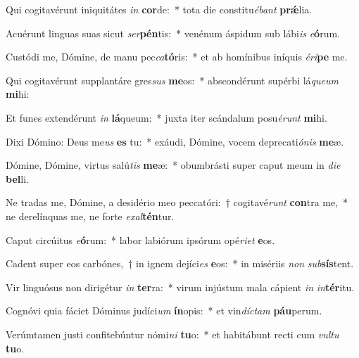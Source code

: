 \item Qui cogitavérunt iniquitátes \textit{in} \textbf{cor}de:~* tota die constitu\textit{é}\textit{bant} \textbf{prǽ}lia.
\item Acuérunt linguas suas sicut \textit{ser}\textbf{pén}tis:~* venénum áspidum sub lábi\textit{is} \textit{e}\textbf{ó}rum.
\item Custódi me, Dómine, de manu pec\textit{ca}\textbf{tó}ris:~* et ab homínibus iníquis \textit{é}\textit{ri}\textbf{pe} me.
\item Qui cogitavérunt supplantáre gres\textit{sus} \textbf{me}os:~* abscondérunt supérbi lá\textit{que}\textit{um} \textbf{mi}hi:
\item Et funes extendérunt \textit{in} \textbf{lá}queum:~* juxta iter scándalum posu\textit{é}\textit{runt} \textbf{mi}hi.
\item Dixi Dómino: Deus me\textit{us} \textbf{es} tu:~* exáudi, Dómine, vocem deprecati\textit{ó}\textit{nis} \textbf{me}æ.
\item Dómine, Dómine, virtus salú\textit{tis} \textbf{me}æ:~* obumbrásti super caput meum in \textit{di}\textit{e} \textbf{bel}li.
\item Ne tradas me, Dómine, a desidério meo peccatóri:~† cogitavé\textit{runt} \textbf{con}tra me,~* ne derelínquas me, ne forte \textit{ex}\textit{al}\textbf{tén}tur.
\item Caput circúitus \textit{e}\textbf{ó}rum:~* labor labiórum ipsórum opé\textit{ri}\textit{et} \textbf{e}os.
\item Cadent super eos carbónes,~† in ignem dejíci\textit{es} \textbf{e}os:~* in misériis \textit{non} \textit{sub}\textbf{sís}tent.
\item Vir linguósus non dirigétur \textit{in} \textbf{ter}ra:~* virum injústum mala cápient \textit{in} \textit{in}\textbf{tér}itu.
\item Cognóvi quia fáciet Dóminus judíci\textit{um} \textbf{ín}opis:~* et vin\textit{díc}\textit{tam} \textbf{páu}perum.
\item Verúmtamen justi confitebúntur nómi\textit{ni} \textbf{tu}o:~* et habitábunt recti cum \textit{vul}\textit{tu} \textbf{tu}o.

